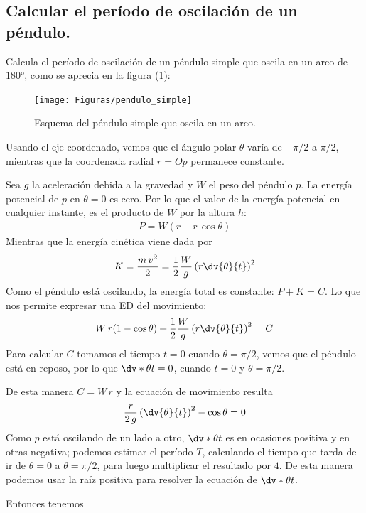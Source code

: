 \subsection*{Calcular el período de oscilación de un péndulo.}
Calcula el período de oscilación de un péndulo simple que oscila en un arco de $\ang{180}$, como se aprecia en la figura (\ref{fig:figura_02}):
\begin{figure}[!ht]
    \centering
    \texttt{[image: Figuras/pendulo\_simple]}
    \caption{Esquema del péndulo simple que oscila en un arco.}
    \label{fig:figura_02}
\end{figure}
Usando el eje coordenado, vemos que el ángulo polar $\theta$ varía de $-\pi/2$ a $\pi/2$, mientras que la coordenada radial $r = Op$ permanece constante.
\par
Sea $g$ la aceleración debida a la gravedad y $W$ el peso del péndulo $p$. La energía potencial de $p$ en $\theta = 0$ es cero. Por lo que el valor de la energía potencial en cualquier instante, es el producto de $W$ por la altura $h$:
\begin{align*}
P = W (r - r \, \cos \theta)
\end{align*}
Mientras que la energía cinética viene dada por
\begin{align*}
K = \dfrac{m \, v^{2}}{2} = \dfrac{1}{2} \dfrac{W}{g} \left( r \dv{\theta}{t} \right)^{2}
\end{align*}
Como el péndulo está oscilando, la energía total es constante: $P + K = C$. Lo que nos permite expresar una ED del movimiento:
\begin{align*}
W \, r (1 - \cos \theta) + \dfrac{1}{2} \dfrac{W}{g} \left( r \dv{\theta}{t} \right)^{2} = C
\end{align*}
Para calcular $C$ tomamos el tiempo $t = 0$ cuando $\theta = \pi/2$, vemos que el péndulo está en reposo, por lo que $\dv*{\theta}{t} = 0$, cuando $t = 0$ y $\theta = \pi/2$.
\par
De esta manera $C = W \, r$ y la ecuación de movimiento resulta
\begin{align*}
\dfrac{r}{2 \, g} \left( \dv{\theta}{t} \right)^{2} - \cos \theta = 0
\end{align*}
Como $p$ está oscilando de un lado a otro, $\dv*{\theta}{t}$ es en ocasiones positiva y en otras negativa; podemos estimar el período $T$, calculando el tiempo que tarda de ir de $\theta=0$ a $\theta=\pi/2$, para luego multiplicar el resultado por $4$. De esta manera podemos usar la raíz positiva para resolver la ecuación de $\dv*{\theta}{t}$.
\par
Entonces tenemos

